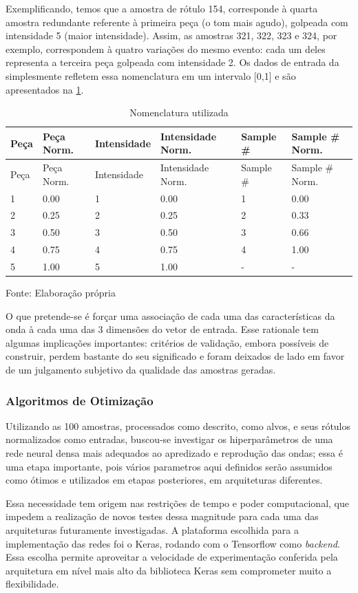 \documentclass[]{article}
\begin{document}
Exemplificando, temos que a amostra de rótulo 154, corresponde à quarta
amostra redundante referente à primeira peça (o tom mais agudo),
golpeada com intensidade 5 (maior intensidade). Assim, as amostras 321,
322, 323 e 324, por exemplo, correspondem à quatro variações do mesmo
evento: cada um deles representa a terceira peça golpeada com
intensidade 2. Os dados de entrada da simplesmente refletem essa
nomenclatura em um intervalo {[}0,1{]} e são apresentados na
\cref{tbl:nom}.

\begin{longtable}[]{@{}llllll@{}}
\caption{Nomenclatura utilizada \label{tbl:nom}}\tabularnewline
\toprule
Peça & Peça Norm. & Intensidade & Intensidade Norm. & Sample \# & Sample
\# Norm.\tabularnewline
\midrule
\endfirsthead
\toprule
Peça & Peça Norm. & Intensidade & Intensidade Norm. & Sample \# & Sample
\# Norm.\tabularnewline
\midrule
\endhead
1 & 0.00 & 1 & 0.00 & 1 & 0.00\tabularnewline
2 & 0.25 & 2 & 0.25 & 2 & 0.33\tabularnewline
3 & 0.50 & 3 & 0.50 & 3 & 0.66\tabularnewline
4 & 0.75 & 4 & 0.75 & 4 & 1.00\tabularnewline
5 & 1.00 & 5 & 1.00 & - & -\tabularnewline
\bottomrule
\end{longtable}

Fonte: Elaboração própria

O que pretende-se é forçar uma associação de cada uma das
características da onda à cada uma das 3 dimensões do vetor de entrada.
Esse rationale tem algumas implicações importantes: critérios de
validação, embora possíveis de construir, perdem bastante do seu
significado e foram deixados de lado em favor de um julgamento subjetivo
da qualidade das amostras geradas.

\hypertarget{algoritmos-de-otimizauxe7uxe3o}{%
\subsubsection{Algoritmos de
Otimização}\label{algoritmos-de-otimizauxe7uxe3o}}

Utilizando as 100 amostras, processados como descrito, como alvos, e
seus rótulos normalizados como entradas, buscou-se investigar os
hiperparâmetros de uma rede neural densa mais adequados ao apredizado e
reprodução das ondas; essa é uma etapa importante, pois vários
parametros aqui definidos serão assumidos como ótimos e utilizados em
etapas posteriores, em arquiteturas diferentes.

Essa necessidade tem origem nas restrições de tempo e poder
computacional, que impedem a realização de novos testes dessa magnitude
para cada uma das arquiteturas futuramente investigadas. A plataforma
escolhida para a implementação das redes foi o Keras, rodando com o
Tensorflow como \emph{backend}. Essa escolha permite aproveitar a
velocidade de experimentação conferida pela arquitetura em nível mais
alto da biblioteca Keras sem comprometer muito a flexibilidade.
\end{document}
